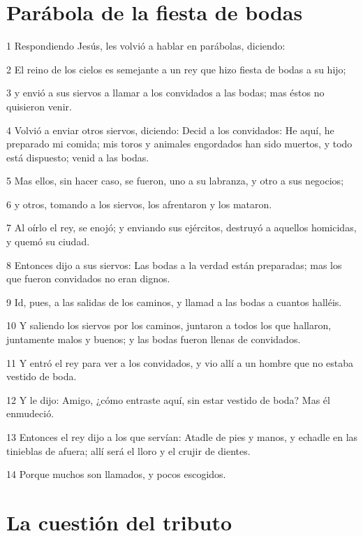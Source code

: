 \section*{Parábola de la fiesta de bodas}

\par 1 Respondiendo Jesús, les volvió a hablar en parábolas, diciendo:
\par 2 El reino de los cielos es semejante a un rey que hizo fiesta de bodas a su hijo;
\par 3 y envió a sus siervos a llamar a los convidados a las bodas; mas éstos no quisieron venir.
\par 4 Volvió a enviar otros siervos, diciendo: Decid a los convidados: He aquí, he preparado mi comida; mis toros y animales engordados han sido muertos, y todo está dispuesto; venid a las bodas.
\par 5 Mas ellos, sin hacer caso, se fueron, uno a su labranza, y otro a sus negocios;
\par 6 y otros, tomando a los siervos, los afrentaron y los mataron.
\par 7 Al oírlo el rey, se enojó; y enviando sus ejércitos, destruyó a aquellos homicidas, y quemó su ciudad.
\par 8 Entonces dijo a sus siervos: Las bodas a la verdad están preparadas; mas los que fueron convidados no eran dignos.
\par 9 Id, pues, a las salidas de los caminos, y llamad a las bodas a cuantos halléis.
\par 10 Y saliendo los siervos por los caminos, juntaron a todos los que hallaron, juntamente malos y buenos; y las bodas fueron llenas de convidados.
\par 11 Y entró el rey para ver a los convidados, y vio allí a un hombre que no estaba vestido de boda.
\par 12 Y le dijo: Amigo, ¿cómo entraste aquí, sin estar vestido de boda? Mas él enmudeció.
\par 13 Entonces el rey dijo a los que servían: Atadle de pies y manos, y echadle en las tinieblas de afuera; allí será el lloro y el crujir de dientes.
\par 14 Porque muchos son llamados, y pocos escogidos.

\section*{La cuestión del tributo}

